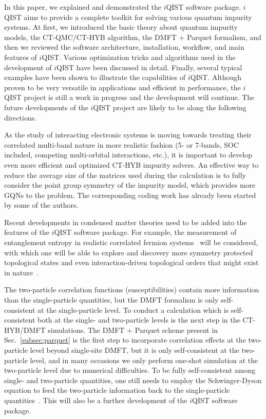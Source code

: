 In this paper, we explained and demonstrated the $i$QIST software package. $i$QIST aims to provide a complete toolkit for solving various quantum impurity systems. At first, we introduced the basic theory about quantum impurity models, the CT-QMC/CT-HYB algorithm, the DMFT + Parquet formalism, and then we reviewed the software architecture, installation, workflow, and main features of $i$QIST. Various optimization tricks and algorithms used in the development of $i$QIST have been discussed in detail. Finally, several typical examples have been shown to illustrate the capabilities of $i$QIST. Although proven to be very versatile in applications and efficient in performance, the $i$QIST project is still a work in progress and the development will continue. The future developments of the $i$QIST project are likely to be along the following directions.

As the study of interacting electronic systems is moving towards treating their correlated multi-band nature in more realistic fashion (5- or 7-bands, SOC included, competing multi-orbital interactions, etc.), it is important to develop even more efficient and optimized CT-HYB impurity solvers. An effective way to reduce the average size of the matrices used during the calculation is to fully consider the point group symmetry of the impurity model, which provides more GQNs to the problem. The corresponding coding work has already been started by some of the authors.

Recent developments in condensed matter theories need to be added into the features of the $i$QIST software package. For example, the measurement of entanglement entropy in realistic correlated fermion systems~\cite{PhysRevLett.111.130402,PhysRevB.89.125121} will be considered, with which one will be able to explore and discovery more symmetry protected topological states and even interaction-driven topological orders that might exist in nature~\cite{Chen21122012,Wang07022014}. 

The two-particle correlation functions (susceptibilities) contain more information than the single-particle quantities, but the DMFT formalism is only self-consistent at the single-particle level. To conduct a calculation which is self-consistent both at the single- and two-particle levels is the next step in the CT-HYB/DMFT simulations. The DMFT + Parquet scheme present in Sec.~\ref{subsec:parquet} is the first step to incorporate correlation effects at the two-particle level beyond single-site DMFT, but it is only self-consistent at the two-particle level, and in many occasions we only perform one-shot simulation at the two-particle level due to numerical difficulties. To be fully self-consistent among single- and two-particle quantities, one still needs to employ the Schwinger-Dyson equation to feed the two-particle information back to the single-particle quantities~\cite{PhysRevE.80.046706,PhysRevE.87.013311}. This will also be a further development of the $i$QIST software package.

